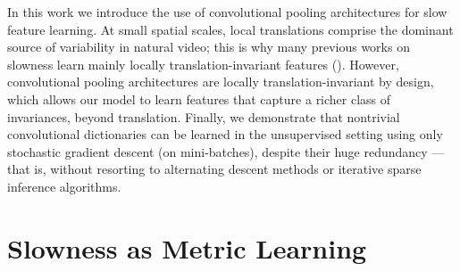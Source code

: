 In this work we introduce the use of convolutional pooling architectures for
slow feature learning.  At small spatial scales, local translations comprise
the dominant source of variability in natural video; this is why many previous
works on slowness learn mainly locally translation-invariant features
(\cite{SFA,SSA,complexCells}). However, convolutional pooling architectures are
locally translation-invariant by design, which allows our model to learn
features that capture a richer class of invariances, beyond translation.
Finally, we demonstrate that nontrivial convolutional dictionaries can be
learned in the unsupervised setting using only stochastic gradient descent (on
mini-batches), despite their huge redundancy --- that is, without resorting to
alternating descent methods or iterative sparse inference algorithms. 


\section{Slowness as Metric Learning } \label{sec:slowmetric}

